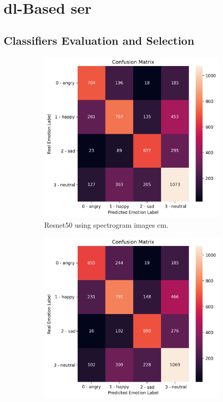 \section{\acl{dl}-Based \ac{ser}}

\subsection{Classifiers Evaluation and Selection} \label{app:6}


\begin{figure}[H]
	\begin{subfigure}{.5\textwidth}
		\centering
		\includegraphics[width=.9\linewidth]{figs/appendix/feature_selection/ResSpec.png}
		\caption{Resnet50 using spectrogram images \ac{cm}.}
	\end{subfigure}%
	\begin{subfigure}{.5\textwidth}
		\centering
		\includegraphics[width=.9\linewidth]{figs/appendix/feature_selection/ResMelSpec.png}

\end{subfigure}
\end{figure}
